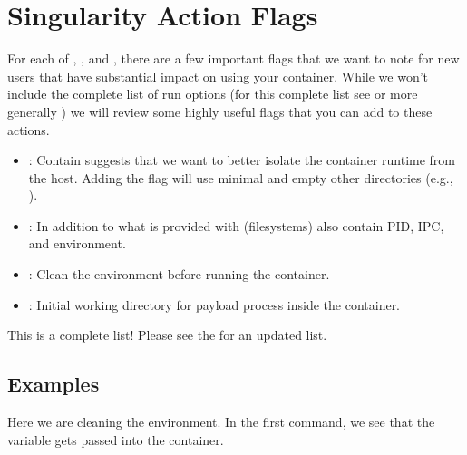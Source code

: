 \documentclass[letterpaper,10pt,english]{sphinxmanual}
\begin{document}
\section{Singularity Action Flags}
\label{\detokenize{appendix:singularity-action-flags}}\label{\detokenize{appendix:id29}}\label{\detokenize{appendix:sec-action-flags}}
For each of , , and , there are a few important flags that we want to note for new users that have substantial impact on using
your container. While we won’t include the complete list of run options (for this complete list see  or more generally
) we will review some highly useful flags that you can add to these actions.
\begin{itemize}
\item {} 
: Contain suggests that we want to better isolate the container runtime from the host. Adding the  flag will use minimal  and empty other directories (e.g., ).

\item {} 
: In addition to what is provided with  (filesystems) also contain PID, IPC, and environment.

\item {} 
: Clean the environment before running the container.

\item {} 
: Initial working directory for payload process inside the container.

\end{itemize}

This is  a complete list! Please see the  for an updated list.


\subsection{Examples}
\label{\detokenize{appendix:examples}}
Here we are cleaning the environment. In the first command, we see that the variable  gets passed into the container.
\end{document}

